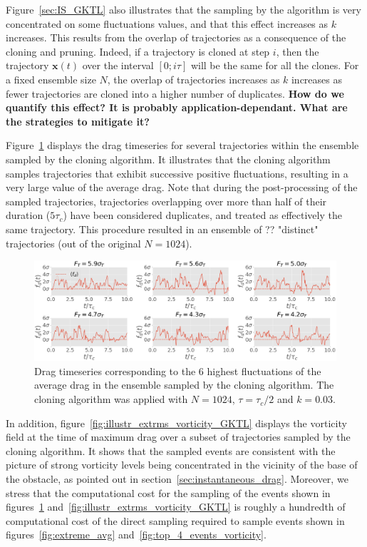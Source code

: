 \documentclass{jfm}
\begin{document}
Figure~\ref{sec:IS_GKTL} also illustrates that the sampling by the algorithm is very concentrated on some fluctuations values, and that this effect increases as $k$ increases.
This results from the overlap of trajectories as a consequence of the cloning and pruning.
Indeed, if a trajectory is cloned at step $i$, then the trajectory ${\mathbf{x}(t)}$ over the interval $[0;i\tau]$ will be the same for all the clones.
For a fixed ensemble size $N$, the overlap of trajectories increases as $k$ increases as fewer
trajectories are cloned into a higher number of duplicates.
\textbf{How do we quantify this effect? It is probably application-dependant. What are the strategies to mitigate it?}

Figure~\ref{fig:timeseries_extrms_AVG_GKTL} displays the drag timeseries for several trajectories within the ensemble sampled by the cloning algorithm.
It illustrates that the cloning algorithm samples trajectories that exhibit successive positive fluctuations, resulting in a very large value of the average drag.
Note that during the post-processing of the sampled trajectories, trajectories overlapping over more than half of their duration ($5 \tau_c$) have been considered duplicates, and treated as effectively the same trajectory.
This procedure resulted in an ensemble of ?? "distinct" trajectories (out of the original $N = 1024$).

\begin{figure}
  \centering
  \includegraphics[width=\linewidth]{timeseries_extrms_AVG_GKTL/timeseries_extrms_AVG_GKTL}
  \caption{Drag timeseries corresponding to the 6 highest fluctuations of the average drag in the ensemble sampled by the cloning algorithm. The cloning algorithm was applied with $N = 1024$, $\tau = \tau_c / 2$ and $k = 0.03$. }
  \label{fig:timeseries_extrms_AVG_GKTL}
\end{figure}

In addition, figure~\ref{fig:illustr_extrms_vorticity_GKTL} displays the vorticity field at the time of maximum drag over a subset of trajectories
sampled by the cloning algorithm.
It shows that the sampled events are consistent with the picture of strong vorticity levels being concentrated in the vicinity of the base of the obstacle, as pointed out in section~\ref{sec:instantaneous_drag}.
Moreover, we stress that the computational cost for the sampling of the events shown in figures~\ref{fig:timeseries_extrms_AVG_GKTL} and~\ref{fig:illustr_extrms_vorticity_GKTL} is roughly a hundredth of computational cost of the direct sampling required to sample events shown in figures~\ref{fig:extreme_avg} and~\ref{fig:top_4_events_vorticity}.
\end{document}
